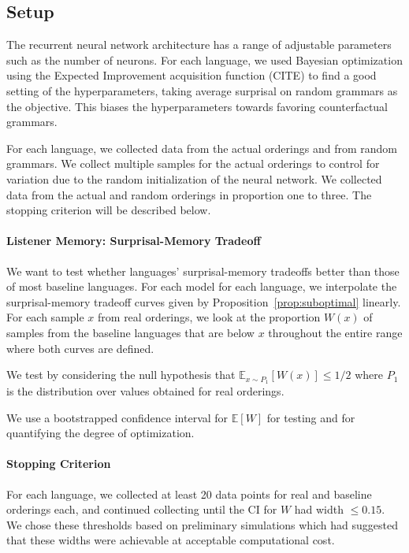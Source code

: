 \documentclass[11pt,letterpaper]{article}
\newcommand{\E}[0]{\mathbb{E}}
\begin{document}
\subsection{Setup}
The recurrent neural network architecture has a range of adjustable parameters such as the number of neurons.
For each language, we used Bayesian optimization using the Expected Improvement acquisition function (CITE) \citep{snoek-practical-2012} to find a good setting of the hyperparameters, taking average surprisal on random grammars as the objective.
This biases the hyperparameters towards favoring counterfactual grammars.


For each language, we collected data from the actual orderings and from random grammars.
We collect multiple samples for the actual orderings to control for variation due to the random initialization of the neural network.
We collected data from the actual and random orderings in proportion one to three.
The stopping criterion will be described below.



\paragraph{Listener Memory: Surprisal-Memory Tradeoff}
We want to test whether languages' surprisal-memory tradeoffs better than those of most baseline languages.
For each model for each language, we interpolate the surprisal-memory tradeoff curves given by Proposition~\ref{prop:suboptimal} linearly.
For each sample $x$ from real orderings, we look at the proportion $W(x)$ of samples from the baseline languages that are below $x$ throughout the entire range where both curves are defined.

We test by considering the null hypothesis that $\E_{x \sim P_1}[W(x)] \leq 1/2$ where $P_1$ is the distribution over values obtained for real orderings.

We use a bootstrapped confidence interval for $\E[W]$ for testing and for quantifying the degree of optimization.

%


\paragraph{Stopping Criterion}

For each language, we collected at least 20 data points for real and baseline orderings each, and continued collecting until the CI for $W$ had width $\leq 0.15$.
We chose these thresholds based on preliminary simulations which had suggested that these widths were achievable at acceptable computational cost.
\end{document}
